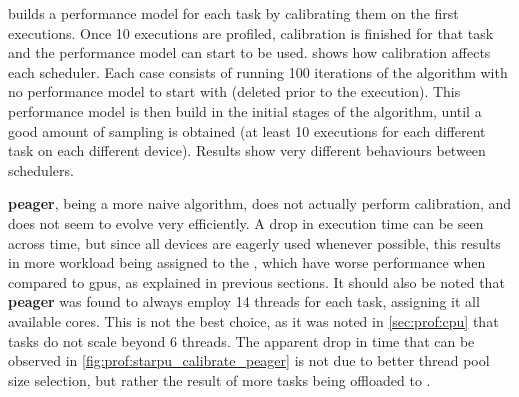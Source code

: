 \documentclass[main.tex]{subfiles}
\begin{document}
\starpu builds a performance model for each task by calibrating them on the first executions. Once 10 executions are profiled, calibration is finished for that task and the performance model can start to be used.  shows how calibration affects each scheduler. Each case consists of running 100 iterations of the algorithm with no performance model to start with (deleted prior to the execution). This performance model is then build in the initial stages of the algorithm, until a good amount of sampling is obtained (at least 10 executions for each different task on each different device).
Results show very different behaviours between schedulers.

\textbf{peager}, being a more naive algorithm, does not actually perform calibration, and does not seem to evolve very efficiently. A drop in execution time can be seen across time, but since all devices are eagerly used whenever possible, this results in more workload being assigned to the \cpus, which have worse performance when compared to gpus, as explained in previous sections. It should also be noted that \textbf{peager} was found to always employ 14 \openmp threads for each task, assigning it all available cores. This is not the best choice, as it was noted in \cref{sec:prof:cpu} that tasks do not scale beyond 6 threads. The apparent drop in \cpu time that can be observed in \cref{fig:prof:starpu_calibrate_peager} is not due to better thread pool size selection, but rather the result of more tasks being offloaded to \gpus.
\end{document}
